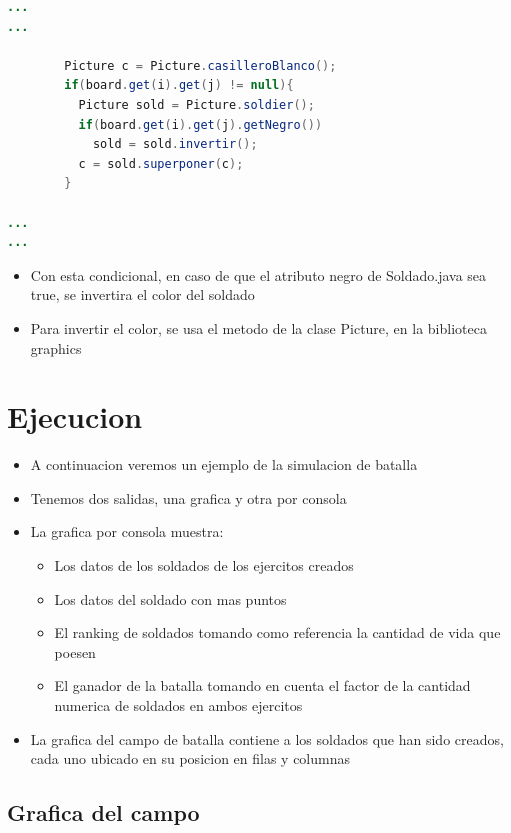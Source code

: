 \begin{lstlisting}[language=java, caption={Soldado.java}]
...
...

        Picture c = Picture.casilleroBlanco();
        if(board.get(i).get(j) != null){
          Picture sold = Picture.soldier();
          if(board.get(i).get(j).getNegro())
            sold = sold.invertir();
          c = sold.superponer(c);
        }

...
...
\end{lstlisting}
\begin{itemize}
    \item Con esta condicional, en caso de que el atributo negro de Soldado.java sea true, se invertira el color del soldado
    \item Para invertir el color, se usa el metodo de la clase Picture, en la biblioteca graphics
\end{itemize}

\section{Ejecucion}
\begin{itemize}
    \item A continuacion veremos un ejemplo de la simulacion de batalla
    \item Tenemos dos salidas, una grafica y otra por consola
    \item La grafica por consola muestra:
    \begin{itemize}
        \item Los datos de los soldados de los ejercitos creados
        \item Los datos del soldado con mas puntos
        \item El ranking de soldados tomando como referencia la cantidad de vida que poesen
        \item El ganador de la batalla tomando en cuenta el factor de la cantidad numerica de soldados en ambos ejercitos
    \end{itemize}
    \item La grafica del campo de batalla contiene a los soldados que han sido creados, cada uno ubicado en su posicion en filas y columnas
\end{itemize}
\subsection{Grafica del campo}

